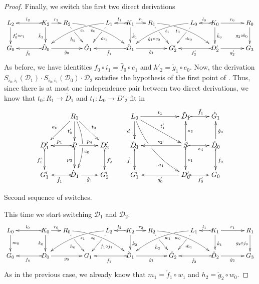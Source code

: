 \documentclass[a4paper,UKenglish,cleveref,pdftex,thm-restate,numberwithinsect]{lipics-v2021}
\def\G{\textbf {\textup{G}}}
\newcommand{\dder}[1]{\mathscr{#1}}
\begin{document}
\begin{proof}
Finally, we switch the first two direct derivations
	\[\xymatrix@C=15pt{L_2\ar[d]^{f'_0\circ c_1}&& K_2 \ar[d]_{\hat{k}_2}\ar@{>->}[ll]_{l_2} \ar[r]^{r_2} & R_2 \ar@/^.35cm/[drrr]_(.4){e_0}|(.29)\hole \ar[dr]|(.28)\hole_{\hat{h}_2} && L_1 \ar@/_.35cm/[dlll]^(.4){e_1} \ar[dl]|(.28)\hole^{\hat{m}_1}& K_1 \ar[d]^{\hat{k}_1}\ar@{>->}[l]_{l_1} \ar[r]^{r_1} & R_1 \ar@/^.35cm/[drrr]_(.4){t_0}|(.29)\hole \ar[dr]|(.28)\hole_{\hat{g}_1\circ c_0}   && L_0  \ar[dl]|(.28)\hole^{\hat{m}_0} \ar@/_.35cm/[dlll]^(.4){t_1}& K_0 \ar[d]^{\hat{k}_0}\ar@{>->}[l]_{l_0} \ar[rr]^{r_0} && R_0 \ar[d]_{g_2\circ b_0} \\G_0 && \ar@{>->}[ll]^{\hat{f}_0} \hat{D}_0 \ar[rr]_{\hat{g}_0}&& \hat{G}_1  && \ar@{>->}[ll]^{\tilde{f}_1} \tilde{D}_1 \ar[rr]_{\tilde{g}_1}&& G'_2 && \ar@{>->}[ll]^{f'_2} D'_2 \ar[rr]_{g'_2}&& G_3 }\]
	As before, we have identities $f_0\circ i_1=\hat{f}_0\circ e_1$ and $h'_2=\tilde{g}_1\circ e_0$. Now, the derivation $S_{i_0, i_1}(\dder{D}_1)\cdot S_{i_0, i_1}(\dder{D}_0)\cdot \dder{D}_2$ satisfies the hypothesis of the first point of . Thus, since there is at most one independence pair between two direct derivations, we know that  $t_0\colon R_1\to \tilde{D}_1$ and $t_1\colon L_0\to D'_2$  fit in
	\[\xymatrix{&R_1 \ar[dl]_{a_0} \ar@{>}[dr]^{t_0} \ar@/^.4cm/[dd]|\hole^(.6){c_0}\ar[d]_{t'_0}&&L_ 0\ar[d]_{d_1} \ar@/_.4cm/[ddrr]|(.41)\hole_(.7){a_1}\ar[drr]^{t'_1} \ar@{>}[rr]^{t_1}&&\tilde{D}_1 \ar@{>->}[r]^{\tilde{f}_1}&\hat{G}_1\\ D'_1 \ar@{>->}[d]_{f'_1}&P\ar@{>->}[d]_{p_3} \ar[r]^{p_4} \ar@{>->}[l]_{p_1}&D'_2\ar@{>->}[d]^{f'_2}&\hat{D}_1 \ar@{>->}[d]_{\hat{f}_1}&&S\ar@{>->}[r]_{s_4} \ar[u]_{s_3}\ar@{>->}[d]^{s_1} \ar[ll]_{s_2} &\hat{D}_0 \ar[u]_{\hat{g}_0} \ar@{>->}[d]^{\hat{f}_0}\\G'_1&\hat{D}_1 \ar@{>->}[l]^{\hat{f}_1}\ar[r]_{\hat{g}_1}& G'_2&G'_1 && D'_0 \ar[ll]^{g'_0}  \ar@{>->}[r]_{f'_0}& G_0 }\]
	
	\smallskip \noindent Second sequence of switches.
	
	This time we start switching $\dder{D}_1$ and $\dder{D}_2$.
	\[\xymatrix@C=15pt{L_0\ar[d]^{m_0}&& K_0 \ar[d]_{k_0}\ar@{>->}[ll]_{l_0} \ar[r]^{r_0} & R_0 \ar@/^.35cm/[drrr]_(.4){z_0}|(.29)\hole \ar[dr]|(.28)\hole_{h_0} && L_2 \ar@/_.35cm/[dlll]^(.4){z_1} \ar[dl]|(.28)\hole^{f_1\circ j_1}& K_2 \ar[d]^{\check{k}_2}\ar@{>->}[l]_{l_2} \ar[r]^{r_2} & R_2 \ar[dr]|(.28)\hole_{\check{h}_2} \ar@/^.35cm/[drrr]_(.4){w_0}|(.29)\hole  && L_1 \ar@/_.35cm/[dlll]^(.4){w_1} \ar[dl]|(.28)\hole^{\check{m}_1}& K_1 \ar[d]^{\check{k}_1}\ar@{>->}[l]_{l_1} \ar[rr]^{r_1} && R_1\ar[d]_{g_2\circ j_0} \\G_0 && \ar@{>->}[ll]^{f_0} D_0 \ar[rr]_{g_0}&& G_1  && \ar@{>->}[ll]^{\check{f}_1} \check{D}_1 \ar[rr]_{\check{g}_1}&& \check{G}_2 && \ar@{>->}[ll]^{\check{f}_2} \check{D}_2 \ar[rr]_{\check{g}_2}&& G_3 }\]
	As in the previous case, we already know that $m_1=\check{f}_1\circ w_1$ and $h_2=\check{g}_2\circ w_0$.
	

\end{proof}
\end{document}
